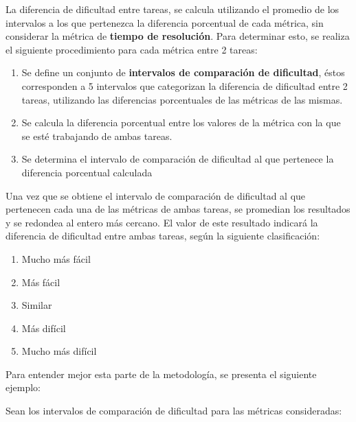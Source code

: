 \documentclass[letterpaper,12pt]{article}
\begin{document}
La diferencia de dificultad entre tareas, se calcula utilizando el promedio de los intervalos a los que pertenezca la diferencia porcentual de cada métrica, sin considerar la métrica de \textbf{tiempo de resolución}. Para determinar esto, se realiza el siguiente procedimiento para cada métrica entre 2 tareas:
\begin{enumerate}
  \item Se define un conjunto de \textbf{intervalos de comparación de dificultad}, éstos corresponden a 5 intervalos que categorizan la diferencia de dificultad entre 2 tareas, utilizando las diferencias porcentuales de las métricas de las mismas.
  \item Se calcula la diferencia porcentual entre los valores de la métrica con la que se esté trabajando de ambas tareas.
  \item Se determina el intervalo de comparación de dificultad al que pertenece la diferencia porcentual calculada
\end{enumerate}
Una vez que se obtiene el intervalo de comparación de dificultad al que pertenecen cada una de las métricas de ambas tareas, se promedian los resultados y se redondea al entero más cercano. El valor de este resultado indicará la diferencia de dificultad entre ambas tareas, según la siguiente clasificación:
\begin{enumerate}
  \item Mucho más fácil
  \item Más fácil
  \item Similar
  \item Más difícil
  \item Mucho más difícil
\end{enumerate}
Para entender mejor esta parte de la metodología, se presenta el siguiente ejemplo:

Sean los intervalos de comparación de dificultad para las métricas consideradas:
\end{document}

